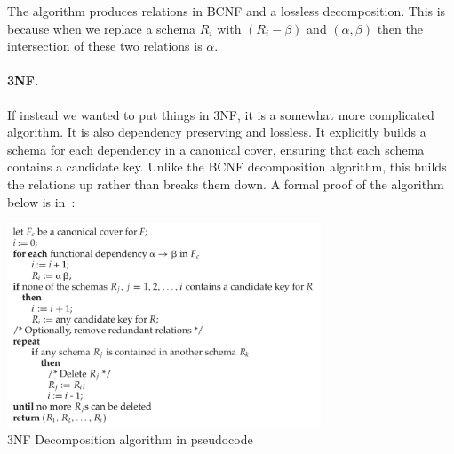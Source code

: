 The algorithm produces relations in BCNF and a lossless decomposition. This is because when we replace a schema $R_{i}$ with $(R_{i} - \beta)$ and $(\alpha, \beta)$ then the intersection of these two relations is $\alpha$.

\paragraph{3NF.} If instead we wanted to put things in 3NF, it is a somewhat more complicated algorithm. It is also dependency preserving and lossless. It explicitly builds a schema for each dependency in a canonical cover, ensuring that each schema contains a candidate key. Unlike the BCNF decomposition algorithm, this builds the relations up rather than breaks them down. A formal proof of the algorithm below is in~\cite{dsc}: 

\begin{center}
\includegraphics[width=0.7\textwidth]{images/3nf-algorithm}\\
3NF Decomposition algorithm in pseudocode~\cite{dsc}
\end{center}




